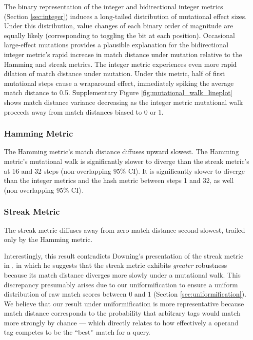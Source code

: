 The binary representation of the integer and bidirectional integer metrics (Section \ref{sec:integer}) induces a long-tailed distribution of mutational effect sizes.
Under this distribution, value changes of each binary order of magnitude are equally likely (corresponding to toggling the bit at each position).
Occasional large-effect mutations provides a plausible explanation for the bidirectional integer metric's rapid increase in match distance under mutation relative to the Hamming and streak metrics.
The integer metric experiences even more rapid dilation of match distance under mutation.
Under this metric, half of first mutational steps cause a wraparound effect, immediately spiking the average match distance to 0.5.
Supplementary Figure \ref{fig:mutational_walk_lineplot} shows match distance variance decreasing as the integer metric mutational walk proceeds away from match distances biased to 0 or 1.

\subsubsection{Hamming Metric}

The Hamming metric's match distance diffuses upward slowest.
The Hamming metric's mutational walk is significantly slower to diverge than the streak metric's at 16 and 32 steps (non-overlapping 95\% CI).
It is significantly slower to diverge than the integer metrics and the hash metric between steps 1 and 32, as well (non-overlapping 95\% CI).

\subsubsection{Streak Metric}

The streak metric diffuses away from zero match distance second-slowest, trailed only by the Hamming metric.

Interestingly, this result contradicts Downing's presentation of the streak metric in \citep{downing2015intelligence}, in which he suggests that the streak metric exhibits \textit{greater} robustness because its match distance diverges more slowly under a mutational walk.
This discrepancy presumably arises due to our uniformification to ensure a uniform distribution of raw match scores between 0 and 1 (Section \ref{sec:uniformification}).
We believe that our result under uniformification is more representative because match distance corresponds to the probability that arbitrary tags would match more strongly by chance --- which directly relates to how effectively a operand tag competes to be the ``best'' match for a query.

